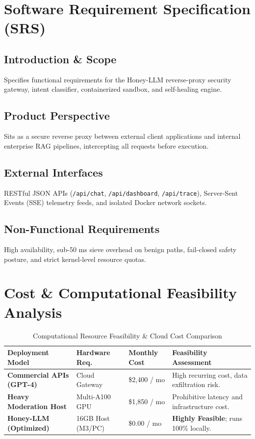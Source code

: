 \documentclass[12pt,a4paper,oneside]{report}
\begin{document}
\section{Software Requirement Specification (SRS)}
\subsection{Introduction \& Scope}
Specifies functional requirements for the Honey-LLM reverse-proxy security gateway, intent classifier, containerized sandbox, and self-healing engine.

\subsection{Product Perspective}
Sits as a secure reverse proxy between external client applications and internal enterprise RAG pipelines, intercepting all requests before execution.

\subsection{External Interfaces}
RESTful JSON APIs (\texttt{/api/chat}, \texttt{/api/dashboard}, \texttt{/api/trace}), Server-Sent Events (SSE) telemetry feeds, and isolated Docker network sockets.

\subsection{Non-Functional Requirements}
High availability, sub-50 ms sieve overhead on benign paths, fail-closed safety posture, and strict kernel-level resource quotas.

\section{Cost \& Computational Feasibility Analysis}
\begin{table}[H]
\small
\renewcommand{\arraystretch}{1.2}
\begin{tabularx}{\textwidth}{@{}p{1.5in} p{1.1in} p{1.1in} X@{}}
\rowcolor{HeaderGray} \textbf{Deployment Model} & \textbf{Hardware Req.} & \textbf{Monthly Cost} & \textbf{Feasibility Assessment} \\
\hline
\textbf{Commercial APIs (GPT-4)} & Cloud Gateway & \$2,400 / mo & High recurring cost, data exfiltration risk. \\
\textbf{Heavy Moderation Host} & Multi-A100 GPU & \$1,850 / mo & Prohibitive latency and infrastructure cost. \\
\textbf{Honey-LLM (Optimized)} & 16GB Host (M3/PC) & \$0.00 / mo & \textbf{Highly Feasible}; runs 100\% locally. \\
\hline
\end{tabularx}
\caption{Computational Resource Feasibility \& Cloud Cost Comparison}
\end{table}
\end{document}
